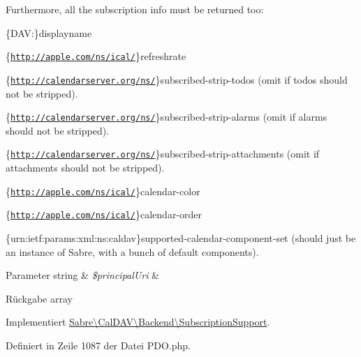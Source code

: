 Furthermore, all the subscription info must be returned too\+:


\begin{DoxyEnumerate}
\item \{D\+AV\+:\}displayname
\item \{\href{http://apple.com/ns/ical/}{\tt http\+://apple.\+com/ns/ical/}\}refreshrate
\item \{\href{http://calendarserver.org/ns/}{\tt http\+://calendarserver.\+org/ns/}\}subscribed-\/strip-\/todos (omit if todos should not be stripped).
\item \{\href{http://calendarserver.org/ns/}{\tt http\+://calendarserver.\+org/ns/}\}subscribed-\/strip-\/alarms (omit if alarms should not be stripped).
\item \{\href{http://calendarserver.org/ns/}{\tt http\+://calendarserver.\+org/ns/}\}subscribed-\/strip-\/attachments (omit if attachments should not be stripped).
\item \{\href{http://apple.com/ns/ical/}{\tt http\+://apple.\+com/ns/ical/}\}calendar-\/color
\item \{\href{http://apple.com/ns/ical/}{\tt http\+://apple.\+com/ns/ical/}\}calendar-\/order
\item \{urn\+:ietf\+:params\+:xml\+:ns\+:caldav\}supported-\/calendar-\/component-\/set (should just be an instance of Sabre, with a bunch of default components).
\end{DoxyEnumerate}


\begin{DoxyParams}[1]{Parameter}
string & {\em \$principal\+Uri} & \\
\hline
\end{DoxyParams}
\begin{DoxyReturn}{Rückgabe}
array 
\end{DoxyReturn}


Implementiert \mbox{\hyperlink{interface_sabre_1_1_cal_d_a_v_1_1_backend_1_1_subscription_support_ae57d04c00b532488fe930f2119b4eb5c}{Sabre\textbackslash{}\+Cal\+D\+A\+V\textbackslash{}\+Backend\textbackslash{}\+Subscription\+Support}}.



Definiert in Zeile 1087 der Datei P\+D\+O.\+php.

\mbox{\label{class_sabre_1_1_cal_d_a_v_1_1_backend_1_1_p_d_o_a2a195c083c83052daed9557a7e9227fa}} 
